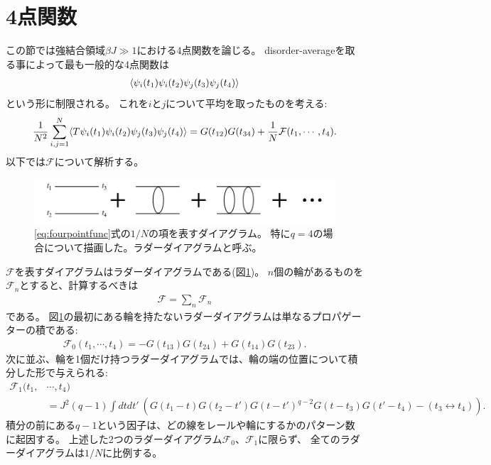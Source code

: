 \section{4点関数\label{sec:fourpointfunc}}

この節では強結合領域$\beta J \gg 1$における4点関数を論じる。
disorder-averageを取る事によって最も一般的な4点関数は
\begin{align}
	\langle \psi_i(t_1)\psi_i(t_2)\psi_j(t_3)\psi_j(t_4) \rangle
\end{align}
という形に制限される。
これを$i$と$j$について平均を取ったものを考える:
\begin{align}
	\frac{1}{N^2}\sum_{i,j=1}^{N}\langle T\psi_i(t_1)\psi_i(t_2)\psi_j(t_3)\psi_j(t_4) \rangle
	= G(t_{12})G(t_{34}) + \frac{1}{N}\mathcal{F}(t_1, \cdots, t_4).
	\label{eq:fourpointfunc}
\end{align}
以下では$\mathcal{F}$について解析する。

\begin{figure}[h]
	\centering
	\vspace{1cm}
	\includegraphics[width=13cm]{figures/ladderDiagram}
	\caption{\eqref{eq:fourpointfunc}式の$1/N$の項を表すダイアグラム。
		特に$q=4$の場合について描画した。ラダーダイアグラムと呼ぶ。}
	\label{fig:ladderdiagram}
\end{figure}

$\mathcal{F}$を表すダイアグラムはラダーダイアグラムである(図\ref{fig:ladderdiagram})。
$n$個の輪があるものを$\mathcal{F}_n$とすると、計算するべきは
\begin{align}
	\mathcal{F} = \sum_n \mathcal{F}_n
\end{align}
である。
図\ref{fig:ladderdiagram}の最初にある輪を持たないラダーダイアグラムは単なるプロパゲーターの積である:
\begin{align}
	\mathcal{F}_0(t_1, \cdots, t_4) = -G(t_{13})G(t_{24}) + G(t_{14})G(t_{23}).
\end{align}
次に並ぶ、輪を1個だけ持つラダーダイアグラムでは、輪の端の位置について積分した形で与えられる:
\begin{align}
	\mathcal{F}_1(t_1, &\cdots, t_4)\nonumber\\
	&= J^2(q - 1)\int dtdt'\ \left(
		G(t_1 - t)G(t_2 - t')G(t - t')^{q-2}G(t - t_3)G(t' - t_4) - (t_3 \leftrightarrow t_4)
	\right).
\end{align}
積分の前にある$q-1$という因子は、どの線をレールや輪にするかのパターン数に起因する。
上述した2つのラダーダイアグラム$\mathcal{F}_0$、$\mathcal{F}_1$に限らず、
全てのラダーダイアグラムは$1/N$に比例する。

